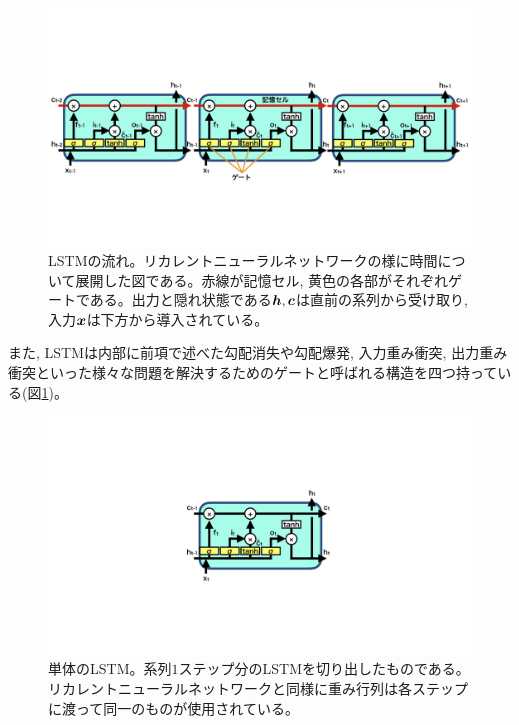 \begin{figure}[htbp]
 \centering
 \includegraphics[trim = 0 200 0 200, width=1.0\textwidth, clip]{Figure/2DeepLearning/10LongShortTermMemory.png}
 \caption[LSTMの流れ]{LSTMの流れ。リカレントニューラルネットワークの様に時間について展開した図である。赤線が記憶セル, 黄色の各部がそれぞれゲートである。出力と隠れ状態である${\mbox{\boldmath{$h$}}},{\mbox{\boldmath{$c$}}}$は直前の系列から受け取り, 入力${\mbox{\boldmath{$x$}}}$は下方から導入されている。}
 \label{10LongShortTermMemory}
\end{figure}

また, LSTMは内部に前項で述べた勾配消失や勾配爆発, 入力重み衝突, 出力重み衝突といった様々な問題を解決するためのゲートと呼ばれる構造を四つ持っている(図\ref{10LongShortTermMemory})。

\begin{figure}[htbp]
 \centering
 \includegraphics[trim = 0 300 0 300, width=1.0\textwidth, clip]{Figure/2DeepLearning/11LSTM.png}
 \caption[単体のLSTM]{単体のLSTM。系列$1$ステップ分のLSTMを切り出したものである。リカレントニューラルネットワークと同様に重み行列は各ステップに渡って同一のものが使用されている。}
 \label{11LSTM}
\end{figure}

